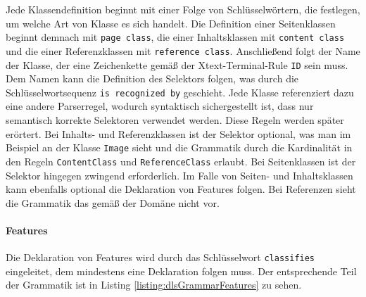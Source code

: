     Jede Klassendefinition beginnt mit einer Folge von Schlüsselwörtern,
    die festlegen, um welche Art von Klasse es sich handelt.
    Die Definition einer Seitenklassen beginnt demnach mit \texttt{page class},
    die einer Inhaltsklassen mit \texttt{content class} und die einer
    Referenzklassen mit \texttt{reference class}.
    Anschließend folgt der Name der Klasse, der eine Zeichenkette gemäß
    der Xtext-Terminal-Rule \texttt{ID} sein muss. %
    Dem Namen kann die Definition des Selektors folgen,
    was durch die Schlüsselwortsequenz \texttt{is recognized by} geschieht.
    Jede Klasse referenziert dazu eine andere Parserregel,
    wodurch syntaktisch sichergestellt ist, dass nur semantisch korrekte Selektoren
    verwendet werden.
    Diese Regeln werden später erörtert.
    Bei Inhalts- und Referenzklassen ist der Selektor optional,
    was man im Beispiel an der Klasse \texttt{Image} sieht und
    die Grammatik durch die Kardinalität in den Regeln \texttt{ContentClass}
    und \texttt{ReferenceClass} erlaubt.
    Bei Seitenklassen ist der Selektor hingegen zwingend erforderlich.
    Im Falle von Seiten- und Inhaltsklassen kann ebenfalls optional die Deklaration von Features folgen.
    Bei Referenzen sieht die Grammatik das gemäß der Domäne nicht vor.

    \paragraph{Features}
    Die Deklaration von Features wird durch das Schlüsselwort \texttt{classifies} eingeleitet,
    dem mindestens eine Deklaration folgen muss.
    Der entsprechende Teil der Grammatik ist in Listing \ref{listing:dlsGrammarFeatures} zu sehen.

    


